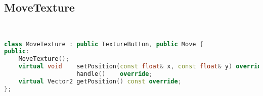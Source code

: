 \subsection{MoveTexture}
\begin{lstlisting}[language=C++]


class MoveTexture : public TextureButton, public Move {
public:
    MoveTexture();
    virtual void    setPosition(const float& x, const float& y) override,
                    handle()    override;
    virtual Vector2 getPosition() const override;
};






\end{lstlisting}
